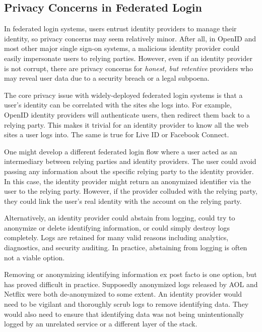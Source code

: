 \documentclass[11pt]{llncs}
\begin{document}
\subsection{Privacy Concerns in Federated Login}

In federated login systems, users entrust identity providers to manage
their identity, so privacy concerns may seem relatively minor. After
all, in OpenID and most other major single sign-on systems, a
malicious identity provider could easily impersonate users to relying
parties. However, even if an identity provider is not corrupt, there
are privacy concerns for \emph{honest, but retentive} providers who
may reveal user data due to a security breach or a legal subpoena.

The core privacy issue with widely-deployed federated login systems is
that a user's identity can be correlated with the sites she logs
into. For example, OpenID identity providers will authenticate users,
then redirect them back to a relying party. This makes it trivial for
an identity provider to know all the web sites a user logs into. The
same is true for Live ID or Facebook Connect.

One might develop a different federated login flow where a user acted
as an intermediary between relying parties and identity providers. The
user could avoid passing any information about the specific relying
party to the identity provider. In this case, the identity provider
might return an anonymized identifier via the user to the relying
party. However, if the provider colluded with the relying party, they
could link the user's real identity with the account on the relying
party.

Alternatively, an identity provider could abstain from logging, could
try to anonymize or delete identifying information, or could simply
destroy logs completely. Logs are retained for many valid reasons
including analytics, diagnostics, and security auditing. In practice,
abstaining from logging is often not a viable option.

Removing or anonymizing identifying information ex post facto is one
option, but has proved difficult in practice. Supposedly anonymized
logs released by AOL \cite{BarZel06} and Netflix \cite{NaSh08} were
both de-anonymized to some extent. An identity provider would need to
be vigilant and thoroughly scrub logs to remove identifying data. They
would also need to ensure that identifying data was not being
unintentionally logged by an unrelated service or a different layer of
the stack.
\end{document}

